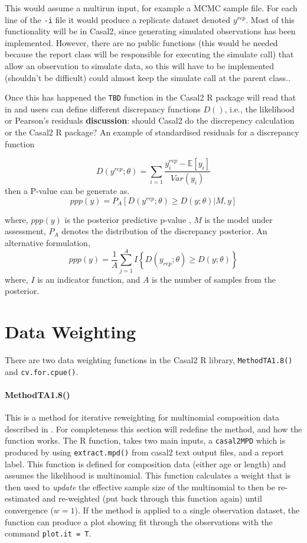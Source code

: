 \documentclass[12pt,preprint,authoryear]{article}
\begin{document}
This would assume a multirun input, for example a MCMC sample file. For each line of the \texttt{-i} file it would produce a replicate dataset denoted \(y^{rep}\). Most of this functionality will be in Casal2, since generating simulated observations has been implemented. However, there are no public functions (this would be needed because the report class will be responsible for executing the simulate call) that allow an observation to simulate data, so this will have to be implemented (shouldn't be difficult) could almost keep the simulate call at the parent class..


Once this has happened the \texttt{TBD} function in the Casal2 R package will read that in and users can define different discrepancy functions \(D()\), i.e., the likelihood or Pearson's residuals \textbf{discussion}: should Casal2 do the discrepency calculation or the Casal2 R package? An example of standardised residuals for a discrepancy function

\[
D\left(y^{rep}; \theta\right) =\sum_{i = 1} \frac{y_i^{rep} - \mathbb{E}[y_i]}{Var(y_i)}
\]
then a P-value can be generate as.
\[
ppp\left(y\right) = P_A\left[D\left(y^{rep}; \theta\right) \geq D\left(y;\theta\right) | M, y\right]
\]

where, \(ppp\left(y\right)\) is the posterior predictive p-value \cite{hjort2006post}, \(M\) is the model under assessment, \(P_A\) denotes the distribution of the discrepancy posterior. An alternative formulation,
\[
ppp\left(y\right) = \frac{1}{A} \sum\limits_{j = 1}^A I \left\{D\left(y_{rep}; \theta\right) \geq D\left(y;\theta\right) \right\}
\]
where, \(I\) is an indicator function, and \(A\) is the number of samples from the posterior.

\section{Data Weighting}

There are two data weighting functions in the Casal2 R library, \texttt{MethodTA1.8()} and \texttt{cv.for.cpue()}.


\paragraph*{MethodTA1.8()}

This is a method for iterative reweighting for multinomial composition data described in \cite{francis2011data}. For completeness this section will redefine the method, and how the function works. The R function, takes two main inputs, a \texttt{casal2MPD} which is produced by using \texttt{extract.mpd()} from casal2 text output files, and a report label. This function is defined for composition data (either age or length) and assumes the likelihood is multinomial. This function calculates a weight that is then used to \textit{update} the effective sample size of the multinomial to then be re-estimated and re-weighted (put back through this function again) until convergence (\(w = 1\)). If the method is applied to a single observation dataset, the function can produce a plot showing fit through the observations with the command \texttt{plot.it = T}.
\end{document}

